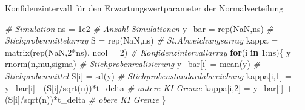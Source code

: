 \documentclass[
  8pt,
  ignorenonframetext,
]{beamer}
\newenvironment{Shaded}{\begin{snugshade}}{\end{snugshade}}
\newcommand{\AttributeTok}[1]{\textcolor[rgb]{0.77,0.63,0.00}{#1}}
\newcommand{\CommentTok}[1]{\textcolor[rgb]{0.56,0.35,0.01}{\textit{#1}}}
\newcommand{\ConstantTok}[1]{\textcolor[rgb]{0.00,0.00,0.00}{#1}}
\newcommand{\ControlFlowTok}[1]{\textcolor[rgb]{0.13,0.29,0.53}{\textbf{#1}}}
\newcommand{\DecValTok}[1]{\textcolor[rgb]{0.00,0.00,0.81}{#1}}
\newcommand{\FloatTok}[1]{\textcolor[rgb]{0.00,0.00,0.81}{#1}}
\newcommand{\FunctionTok}[1]{\textcolor[rgb]{0.00,0.00,0.00}{#1}}
\newcommand{\NormalTok}[1]{#1}
\newcommand{\OtherTok}[1]{\textcolor[rgb]{0.56,0.35,0.01}{#1}}
\newcommand{\SpecialCharTok}[1]{\textcolor[rgb]{0.00,0.00,0.00}{#1}}
\begin{document}
\begin{frame}[fragile]{Konfidenzintervall für den
Erwartungswertparameter der Normalverteilung}
\begin{Shaded}
\begin{Highlighting}[]
\CommentTok{\# Simulation}
\NormalTok{ns      }\OtherTok{=} \FloatTok{1e2}                                      \CommentTok{\# Anzahl Simulationen}
\NormalTok{y\_bar   }\OtherTok{=} \FunctionTok{rep}\NormalTok{(}\ConstantTok{NaN}\NormalTok{,ns)                              }\CommentTok{\# Stichprobenmittelarray}
\NormalTok{S       }\OtherTok{=} \FunctionTok{rep}\NormalTok{(}\ConstantTok{NaN}\NormalTok{,ns)                              }\CommentTok{\# St.Abweichungsarray}
\NormalTok{kappa   }\OtherTok{=} \FunctionTok{matrix}\NormalTok{(}\FunctionTok{rep}\NormalTok{(}\ConstantTok{NaN}\NormalTok{,}\DecValTok{2}\SpecialCharTok{*}\NormalTok{ns), }\AttributeTok{ncol =} \DecValTok{2}\NormalTok{)          }\CommentTok{\# Konfidenzintervallarray}
\ControlFlowTok{for}\NormalTok{(i }\ControlFlowTok{in} \DecValTok{1}\SpecialCharTok{:}\NormalTok{ns)\{}
\NormalTok{   y          }\OtherTok{=} \FunctionTok{rnorm}\NormalTok{(n,mu,sigma)                  }\CommentTok{\# Stichprobenrealisierung}
\NormalTok{   y\_bar[i]   }\OtherTok{=} \FunctionTok{mean}\NormalTok{(y)                            }\CommentTok{\# Stichprobenmittel}
\NormalTok{   S[i]       }\OtherTok{=} \FunctionTok{sd}\NormalTok{(y)                              }\CommentTok{\# Stichprobenstandardabweichung}
\NormalTok{   kappa[i,}\DecValTok{1}\NormalTok{] }\OtherTok{=}\NormalTok{ y\_bar[i] }\SpecialCharTok{{-}}\NormalTok{ (S[i]}\SpecialCharTok{/}\FunctionTok{sqrt}\NormalTok{(n))}\SpecialCharTok{*}\NormalTok{t\_delta  }\CommentTok{\# untere KI Grenze}
\NormalTok{   kappa[i,}\DecValTok{2}\NormalTok{] }\OtherTok{=}\NormalTok{ y\_bar[i] }\SpecialCharTok{+}\NormalTok{ (S[i]}\SpecialCharTok{/}\FunctionTok{sqrt}\NormalTok{(n))}\SpecialCharTok{*}\NormalTok{t\_delta  }\CommentTok{\# obere KI Grenze}
\NormalTok{\}}
\end{Highlighting}
\end{Shaded}
\end{frame}
\end{document}
